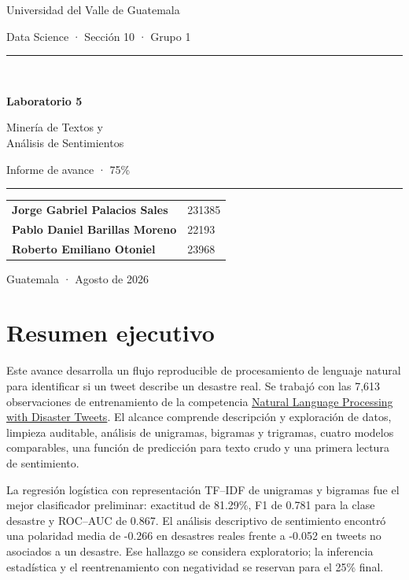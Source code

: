\documentclass[11pt,letterpaper]{article}
\begin{document}

\begin{titlepage}
\pagecolor{navy}
\color{white}
\vspace*{1.5cm}
{\Large Universidad del Valle de Guatemala\par}
\vspace{0.25cm}
{\large Data Science · Sección 10 · Grupo 1\par}
\vfill
{\color{teal}\rule{\linewidth}{2.5pt}}\\[0.65cm]
{\Huge\bfseries Laboratorio 5\par}
\vspace{0.35cm}
{\LARGE Minería de Textos y\\Análisis de Sentimientos\par}
\vspace{0.6cm}
{\Large Informe de avance · 75\%\par}
\vspace{0.65cm}
{\color{teal}\rule{\linewidth}{2.5pt}}
\vfill
\begin{tabular}{@{}ll@{}}
\textbf{Jorge Gabriel Palacios Sales} & 231385\\[4pt]
\textbf{Pablo Daniel Barillas Moreno} & 22193\\[4pt]
\textbf{Roberto Emiliano Otoniel} & 23968
\end{tabular}
\vfill
{\large Guatemala · Agosto de 2026\par}
\end{titlepage}
\nopagecolor
\color{navy}

\tableofcontents
\newpage

\section{Resumen ejecutivo}

Este avance desarrolla un flujo reproducible de procesamiento de lenguaje natural para identificar si un tweet describe un desastre real. Se trabajó con las 7,613 observaciones de entrenamiento de la competencia \href{https://www.kaggle.com/competitions/nlp-getting-started}{Natural Language Processing with Disaster Tweets}. El alcance comprende descripción y exploración de datos, limpieza auditable, análisis de unigramas, bigramas y trigramas, cuatro modelos comparables, una función de predicción para texto crudo y una primera lectura de sentimiento.

La regresión logística con representación TF--IDF de unigramas y bigramas fue el mejor clasificador preliminar: exactitud de 81.29\%, F1 de 0.781 para la clase desastre y ROC--AUC de 0.867. El análisis descriptivo de sentimiento encontró una polaridad media de -0.266 en desastres reales frente a -0.052 en tweets no asociados a un desastre. Ese hallazgo se considera exploratorio; la inferencia estadística y el reentrenamiento con negatividad se reservan para el 25\% final.
\end{document}
